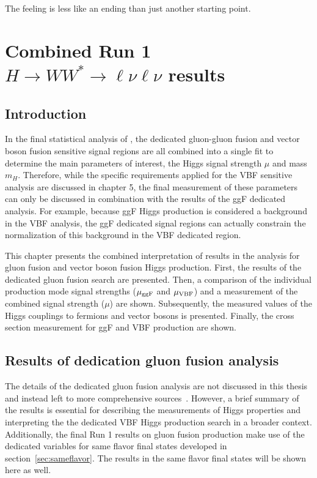 \begin{savequote}[75mm]
The feeling is less like an ending than just another starting point.
\end{savequote}

\chapter{Combined Run 1 $H\rightarrow WW^{*}\rightarrow \ell\nu\ell\nu$ results}

\section{Introduction}

In the final statistical analysis of \HWWfull, the dedicated gluon-gluon fusion and vector boson fusion sensitive signal regions are all combined into a single fit to determine the main parameters of interest, the Higgs signal strength $\mu$ and mass $m_H$. Therefore, while the specific requirements applied for the VBF sensitive analysis are discussed in chapter 5, the final measurement of these parameters can only be discussed in combination with the results of the ggF dedicated analysis. For example, because ggF Higgs production is considered a background in the VBF analysis, the ggF dedicated signal regions can actually constrain the normalization of this background in the VBF dedicated region.

This chapter presents the combined interpretation of results in the \HWWfull analysis for gluon fusion and vector boson fusion Higgs production. First, the results of the dedicated gluon fusion search are presented. Then, a comparison of the individual production mode signal strengths ($\mu_{{\rm ggF}}$ and $\mu_{{\rm VBF}}$) and a measurement of the combined signal strength ($\mu$) are shown. Subsequently, the measured values of the Higgs couplings to fermions and vector bosons is presented. Finally, the cross section measurement for ggF and VBF production are shown. 

\section{Results of dedication gluon fusion \HWWfull analysis}

The details of the dedicated gluon fusion \HWWfull analysis are not discussed in this thesis and instead left to more comprehensive sources~\cite{WW2015}. However, a brief summary of the results is essential for describing the measurements of Higgs properties and interpreting the the dedicated VBF Higgs production search in a broader context. Additionally, the final Run 1 results on gluon fusion production make use of the dedicated variables for same flavor final states developed in section~\ref{sec:sameflavor}. The results in the same flavor final states will be shown here as well. 

